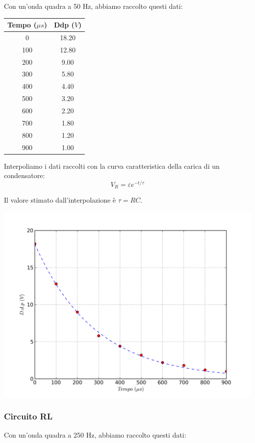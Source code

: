 Con un'onda quadra a 50 Hz, abbiamo raccolto questi dati:
\begin{center}
\begin{tabular}{*{2}{c}}
Tempo ($\mu s$) & Ddp ($V$) \\
\midrule
0 & 18.20 \\
100 & 12.80 \\
200 & 9.00 \\
300 & 5.80 \\
400 & 4.40 \\
500 & 3.20 \\
600 & 2.20 \\
700 & 1.80 \\
800 & 1.20 \\
900 & 1.00 \\
\end{tabular}
\end{center}

Interpoliamo i dati raccolti con la curva caratteristica della carica di un condensatore: 
$$V_R = \varepsilon e^{-t/\tau}$$

Il valore stimato dall'interpolazione è $\tau=RC$.


\begin{center}
 \includegraphics[scale=0.70]{grafici/C3/fitcond.png}
\end{center}




\subsubsection{Circuito RL}
Con un'onda quadra a 250 Hz, abbiamo raccolto questi dati:

